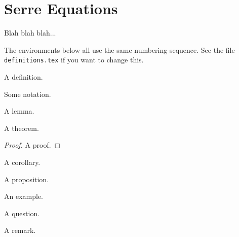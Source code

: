 
\chapter{Serre Equations}
\label{chp:Serreeqns}



Blah blah blah...

The environments below all use the same numbering sequence.  See
the file \verb+definitions.tex+ if you want to change this.

\begin{defn}
A definition.
\end{defn}

\begin{notn}
Some notation.
\end{notn}

\begin{lemma}
A lemma.
\end{lemma}

\begin{theorem}
A theorem.
\end{theorem}

\begin{proof}
A proof.
\end{proof}

\begin{cor}
A corollary.
\end{cor}

\begin{prop}
A proposition.
\end{prop}

\begin{ex}
An example.
\end{ex}

\begin{question}
A question.
\end{question}

\begin{remark}
A remark.
\end{remark}

